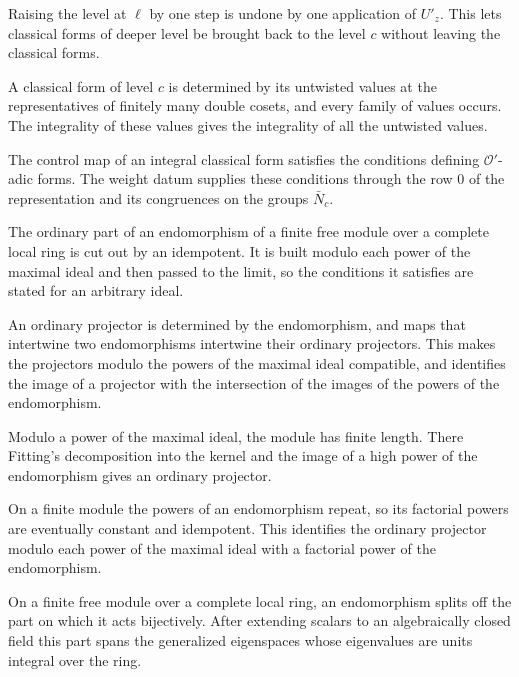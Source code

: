 Raising the level at $\ell$ by one step is undone by one application of $U'_z$. This lets classical forms of deeper level be brought back to the level $c$ without leaving the classical forms.

A classical form of level $c$ is determined by its untwisted values at the representatives of finitely many double cosets, and every family of values occurs. The integrality of these values gives the integrality of all the untwisted values.

The control map of an integral classical form satisfies the conditions defining $\mathcal O'$-adic forms. The weight datum supplies these conditions through the row $0$ of the representation and its congruences on the groups $\bar N_c$.

The ordinary part of an endomorphism of a finite free module over a complete local ring is cut out by an idempotent. It is built modulo each power of the maximal ideal and then passed to the limit, so the conditions it satisfies are stated for an arbitrary ideal.

An ordinary projector is determined by the endomorphism, and maps that intertwine two endomorphisms intertwine their ordinary projectors. This makes the projectors modulo the powers of the maximal ideal compatible, and identifies the image of a projector with the intersection of the images of the powers of the endomorphism.

Modulo a power of the maximal ideal, the module has finite length. There Fitting's decomposition into the kernel and the image of a high power of the endomorphism gives an ordinary projector.

On a finite module the powers of an endomorphism repeat, so its factorial powers are eventually constant and idempotent. This identifies the ordinary projector modulo each power of the maximal ideal with a factorial power of the endomorphism.

On a finite free module over a complete local ring, an endomorphism splits off the part on which it acts bijectively. After extending scalars to an algebraically closed field this part spans the generalized eigenspaces whose eigenvalues are units integral over the ring.

